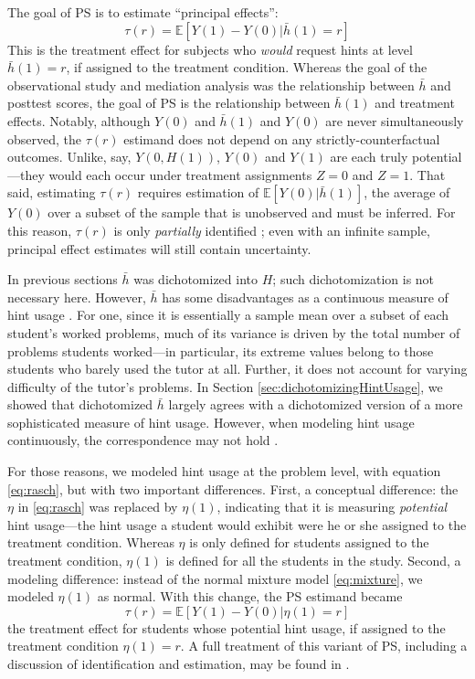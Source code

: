 \documentclass{article}\usepackage[]{graphicx}\usepackage[]{color}
\newcommand{\EE}{\mathbb{E}}
\begin{document}
The goal of PS is to estimate ``principal
effects'':
\begin{equation*}
\tau(r)=\EE[Y(1)-Y(0)|\bar{h}(1)=r]
\end{equation*}
This is the treatment effect for subjects who \emph{would} request
hints at level $\bar{h}(1)=r$, if assigned to the treatment condition.
Whereas the goal of the observational study and mediation
analysis was the relationship between $\bar{h}$ and posttest scores, the
goal of PS is the relationship between $\bar{h}(1)$ and treatment effects.
Notably, although $Y(0)$ and $\bar{h}(1)$ and $Y(0)$ are never
simultaneously observed, the $\tau(r)$ estimand does not depend on any
strictly-counterfactual outcomes.
Unlike, say, $Y(0,H(1))$, $Y(0)$ and $Y(1)$ are each truly
potential---they would each occur under treatment assignments $Z=0$
and $Z=1$.
That said, estimating $\tau(r)$ requires estimation of
$\EE[Y(0)|\bar{h}(1)]$, the average of $Y(0)$ over a subset of the
sample that is unobserved and must be inferred.
For this reason, $\tau(r)$ is only \emph{partially} identified
\citep[e.g.][]{mealli2016identification}; even with an infinite
sample, principal effect estimates will still contain uncertainty.

In previous sections $\bar{h}$ was dichotomized into $H$; such
dichotomization is not necessary here.
However, $\bar{h}$ has some disadvantages as a continuous measure of
hint usage \citep{aoas}.
For one, since it is essentially a sample mean over a subset of each student's
worked problems, much of its variance is driven by the total number of
problems students worked---in particular, its extreme values belong to
those students who barely used the tutor at all.
Further, it does not account for varying difficulty of the tutor's
problems.
In Section \ref{sec:dichotomizingHintUsage}, we showed that
dichotomized $\bar{h}$ largely agrees with a dichotomized version of a
more sophisticated measure of hint usage.
However, when modeling hint usage continuously, the correspondence may
not hold \citep[see][for a more complete discussion]{aoas}.

For those reasons, we modeled hint usage at the problem level, with
equation \eqref{eq:rasch}, but with two important differences.
First, a conceptual difference: the $\eta$ in \eqref{eq:rasch} was
replaced by $\eta (1)$, indicating that it is measuring
\emph{potential} hint usage---the hint usage a student would exhibit
were he or she assigned to the treatment condition.
Whereas $\eta$ is only defined for students assigned to the treatment condition,
$\eta(1)$ is defined for all the students in the study.
Second, a modeling difference: instead of the normal mixture model
\eqref{eq:mixture}, we modeled $\eta(1)$ as normal.
With this change, the PS estimand became
\begin{equation*}
\tau(r)=\EE[Y(1)-Y(0)|\eta(1)=r]
\end{equation*}
the treatment effect for students whose potential hint usage, if assigned to the treatment condition $\eta(1)=r$.
A full treatment of this variant of PS, including a
discussion of identification and estimation, may be found in
\citet{aoas}.
\end{document}
